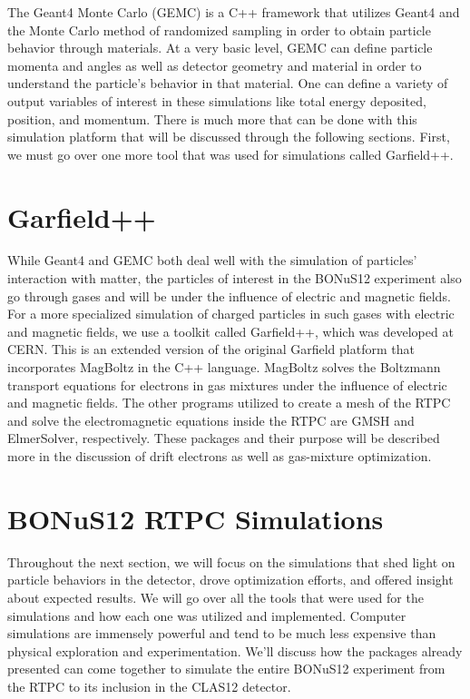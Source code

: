 The Geant4 Monte Carlo (GEMC) is a C++ framework that utilizes Geant4 and the Monte Carlo method of randomized sampling in order to obtain particle behavior through materials. At a very basic level, GEMC can define particle momenta and angles as well as detector geometry and material in order to understand the particle's behavior in that material. One can define a variety of output variables of interest in these simulations like total energy deposited, position, and momentum. There is much more that can be done with this simulation platform that will be discussed through the following sections. First, we must go over one more tool that was used for simulations called Garfield++.

\section{Garfield++}
While Geant4 and GEMC both deal well with the simulation of particles' interaction with matter, the particles of interest in the BONuS12 experiment also go through gases and will be under the influence of electric and magnetic fields. For a more specialized simulation of charged particles in such gases with electric and magnetic fields, we use a toolkit called Garfield++, which was developed at CERN. This is an extended version of the original Garfield platform that incorporates MagBoltz in the C++ language. MagBoltz solves the Boltzmann transport equations for electrons in gas mixtures under the influence of electric and magnetic fields. The other programs utilized to create a mesh of the RTPC and solve the electromagnetic equations inside the RTPC are GMSH and ElmerSolver, respectively. These packages and their purpose will be described more in the discussion of drift electrons as well as gas-mixture optimization.

\section{BONuS12 RTPC Simulations}
Throughout the next section, we will focus on the simulations that shed light on particle behaviors in the detector, drove optimization efforts, and offered insight about expected results. We will go over all the tools that were used for the simulations and how each one was utilized and implemented. Computer simulations are immensely powerful and tend to be much less expensive than physical exploration and experimentation. We'll discuss how the packages already presented can come together to simulate the entire BONuS12 experiment from the RTPC to its inclusion in the CLAS12 detector.

